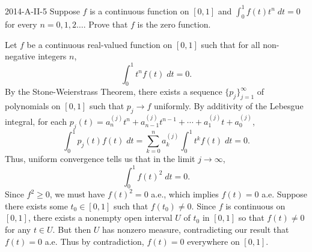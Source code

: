 \documentclass{article}
\begin{document}
	\begin{prb}{2014-A-II-5}
		Suppose $f$ is a continuous function on $[0,1]$ and $\int_0^1f(t)t^n\;dt = 0$ for every $n = 0,1,2\ldots$. Prove that $f$ is the zero function. 
	\end{prb}
	Let $f$ be a continuous real-valued function on $[0,1]$ such that for all non-negative integers $n$, 
	\begin{equation*}
		\int_0^1t^nf(t)\;dt = 0. 
	\end{equation*}
	By the Stone-Weierstrass Theorem, there exists a sequence $\{p_j\}_{j = 1}^{\infty}$ of polynomials on $[0,1]$ such that $p_j \to f$ uniformly. By additivity of the Lebesgue integral, for each $p_j(t) = a^{(j)}_nt^n + a^{(j)}_{n-1}t^{n-1} + \dotsm + a^{(j)}_{1}t + a_{0}^{(j)}$, 
	\begin{equation*}
		\int_{0}^{1}p_j(t)f(t)\;dt = \sum_{k  = 0}^{n}a_{k}^{(j)}\int_{0}^1t^{k}f(t)\;dt = 0. 
	\end{equation*}
	Thus, uniform convergence tells us that in the limit $j \to \infty$, 
	\begin{equation*}
		\int_{0}^{1}f(t)^2\;dt = 0. 
	\end{equation*}
	Since $f^2 \geq 0$, we must have $f(t)^2 = 0$ a.e., which implies $f(t) =0$ a.e. Suppose there exists some $t_0 \in [0,1]$ such that $f(t_0) \neq 0$. Since $f$ is continuous on $[0,1]$, there exists a nonempty open interval $U$ of $t_0$ in $[0,1]$ so that $f(t) \neq 0$ for any $t \in U$. But then $U$ has nonzero measure, contradicting our result that $f(t) =0 $ a.e. Thus by contradiction, $f(t) = 0$ everywhere on $[0,1]$. 
	
\end{document}
